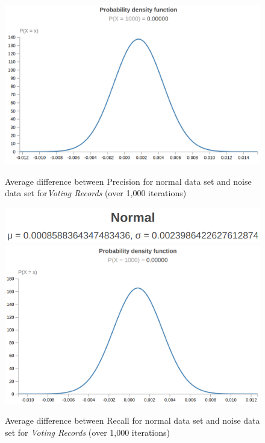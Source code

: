 \documentclass[twoside,11pt]{article}
\begin{document}
\begin{figure}[!hbp]
\begin{minipage}[b]{0.3\textwidth}
        \includegraphics[width=\textwidth]{vr-p-df.png}
        \caption{Average difference between Precision for normal data set and noise data set for\emph{Voting Records} (over 1,000 iterations)}
    \end{minipage}
    \hfill
    \begin{minipage}[b]{0.3\textwidth}
        \includegraphics[width=\textwidth]{vr-r-ms.png}
        \includegraphics[width=\textwidth]{vr-r-df.png}
        \caption{Average difference between Recall for normal data set and noise data set for \emph{Voting Records} (over 1,000 iterations)}
    \end{minipage}
\end{figure}
\end{document}
